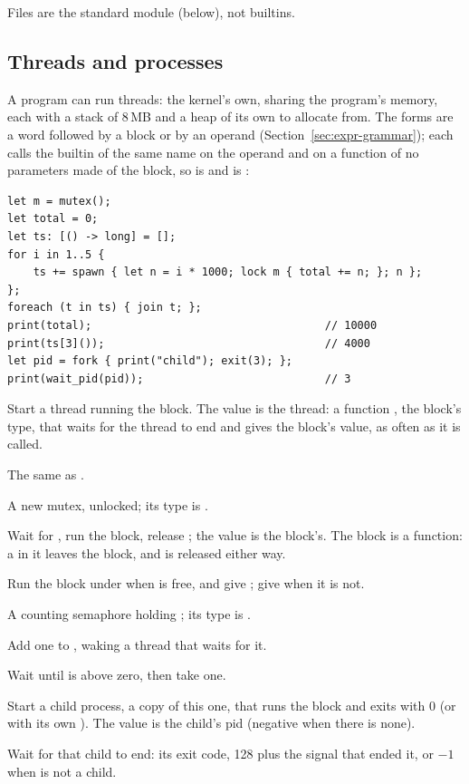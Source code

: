 \noindent Files are the standard module  (below), not builtins.

\subsection{Threads and processes}
\label{sec:builtin-threads}

A program can run threads: the kernel's own, sharing the program's
memory, each with a stack of 8\,MB and a heap of its own to allocate
from. The forms are a word followed by a block or by an operand
(Section~\ref{sec:expr-grammar}); each calls the builtin of the same name
on the operand and on a function of no parameters made of the block, so
 is  and 
is :

\begin{lstlisting}
let m = mutex();
let total = 0;
let ts: [() -> long] = [];
for i in 1..5 {
    ts += spawn { let n = i * 1000; lock m { total += n; }; n };
};
foreach (t in ts) { join t; };
print(total);                                    // 10000
print(ts[3]());                                  // 4000
let pid = fork { print("child"); exit(3); };
print(wait_pid(pid));                            // 3
\end{lstlisting}

\begin{description}[style=nextline,leftmargin=5.2em]
\item[\ic{spawn \{ e \}}] Start a thread running the block. The value
  is the thread: a function ,  the block's type, that
  waits for the thread to end and gives the block's value, as often as
  it is called.
\item[\ic{join t}] The same as .
\item[\ic{mutex()}] A new mutex, unlocked; its type is .
\item[\ic{lock m \{ e \}}] Wait for , run the block, release
  ; the value is the block's. The block is a function: a
   in it leaves the block, and  is released either way.
\item[\ic{try\_lock m \{ e \}}] Run the block under  when 
  is free, and give ; give  when it is not.
\item[\ic{sem(n)}] A counting semaphore holding ; its type is
  .
\item[\ic{post s}] Add one to , waking a thread that waits for it.
\item[\ic{wait s}] Wait until  is above zero, then take one.
\item[\ic{fork \{ e \}}] Start a child process, a copy of this one, that
  runs the block and exits with 0 (or with its own ). The value
  is the child's pid (negative when there is none).
\item[\ic{wait\_pid(pid)}] Wait for that child to end: its exit code,
  128 plus the signal that ended it, or $-1$ when  is not a
  child.
\end{description}

